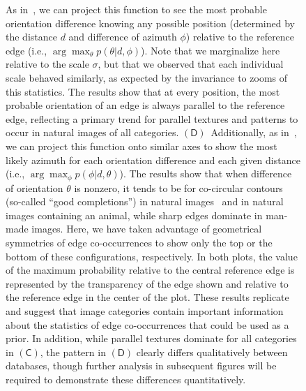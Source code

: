 \documentclass[a4paper]{article}
\begin{document}
\begin{figure}
{{As in~\autocite{Geisler01}, we can project this function to see the most probable orientation difference 
knowing any possible position (determined by the distance $d$ and difference of azimuth $\phi$) 
relative to the reference edge (i.e., $\arg\max_\theta p( \theta | d, \phi)$). 
Note that we marginalize here relative to the scale $\sigma$, 
but that we observed that each individual scale behaved similarly, 
as expected by the invariance to zooms of this statistics. 
The results show that at every position, the most probable orientation of an edge 
is always parallel to the reference edge, 
reflecting a primary trend for parallel textures and patterns to occur in natural images of all categories.  
$\mathsf{(D)}$~Additionally, as in~\autocite{Geisler01}, we can project this function 
onto similar axes to show the most likely azimuth for 
each orientation difference and each given distance (i.e., $\arg\max_\phi p(\phi | d, \theta)$). 
The results show that when difference of orientation $\theta$ is nonzero, 
it tends to be for co-circular contours (so-called ``good completions'') 
in natural images~\autocite{Sigman01} and in natural images containing an animal, 
while sharp edges dominate in man-made images. 
Here, we have taken advantage of geometrical symmetries of edge co-occurrences 
to show only the top or the bottom of these configurations, respectively. 
In both plots, the value of the maximum probability relative to the central reference edge 
is represented by the transparency of the edge shown and relative 
to the reference edge in the center of the plot. 
These results replicate~\autocite{Geisler01} 
and suggest that image categories contain important information 
about the statistics of edge co-occurrences 
that could be used as a prior. 
In addition, while parallel textures dominate for all categories in $\mathsf{(C)}$, 
the pattern in $\mathsf{(D)}$ clearly differs qualitatively between databases, 
though further analysis in subsequent figures will be required 
to demonstrate these differences quantitatively.  
}
\label{fig:model}} %
\end{figure} %
%
\end{document}
